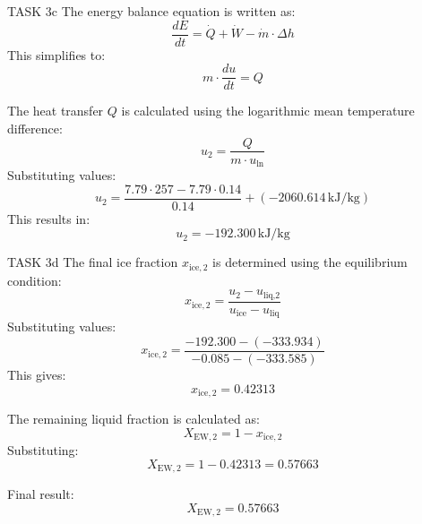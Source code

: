 TASK 3c  
The energy balance equation is written as:  
\[
\frac{dE}{dt} = \dot{Q} + \dot{W} - \dot{m} \cdot \Delta h
\]  
This simplifies to:  
\[
m \cdot \frac{du}{dt} = Q
\]  

The heat transfer \( Q \) is calculated using the logarithmic mean temperature difference:  
\[
u_2 = \frac{Q}{m \cdot u_{\text{ln}}}
\]  
Substituting values:  
\[
u_2 = \frac{7.79 \cdot 257 - 7.79 \cdot 0.14}{0.14} + (-2060.614 \, \text{kJ/kg})
\]  
This results in:  
\[
u_2 = -192.300 \, \text{kJ/kg}
\]  

TASK 3d  
The final ice fraction \( x_{\text{ice},2} \) is determined using the equilibrium condition:  
\[
x_{\text{ice},2} = \frac{u_2 - u_{\text{liq,2}}}{u_{\text{ice}} - u_{\text{liq}}}
\]  
Substituting values:  
\[
x_{\text{ice},2} = \frac{-192.300 - (-333.934)}{-0.085 - (-333.585)}
\]  
This gives:  
\[
x_{\text{ice},2} = 0.42313
\]  

The remaining liquid fraction is calculated as:  
\[
X_{\text{EW},2} = 1 - x_{\text{ice},2}
\]  
Substituting:  
\[
X_{\text{EW},2} = 1 - 0.42313 = 0.57663
\]  

Final result:  
\[
X_{\text{EW},2} = 0.57663
\]